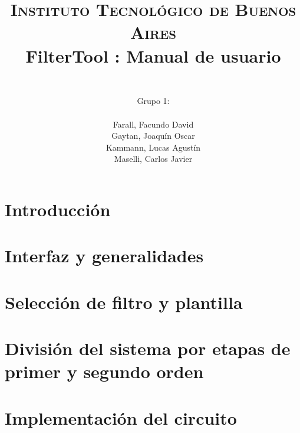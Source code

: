 



	\title{
		\normalfont \normalsize \textsc{Instituto Tecnol\'ogico de Buenos Aires} \\ [25pt]
		\huge FilterTool : Manual de usuario \\
		\author{
			\\Grupo 1:\\\\Farall, Facundo David\\Gaytan, Joaqu\'in Oscar\\Kammann, Lucas Agust\'in\\Maselli, Carlos Javier		 
		}
	}
	\maketitle
	\newpage
\newpage

	\tableofcontents
	\newpage


\section{Introducci\'on}

\section{Interfaz y generalidades}
\section{Selecci\'on de filtro y plantilla}

\section{Divisi\'on del sistema por etapas de primer y segundo orden}
\section{Implementaci\'on del circuito}
